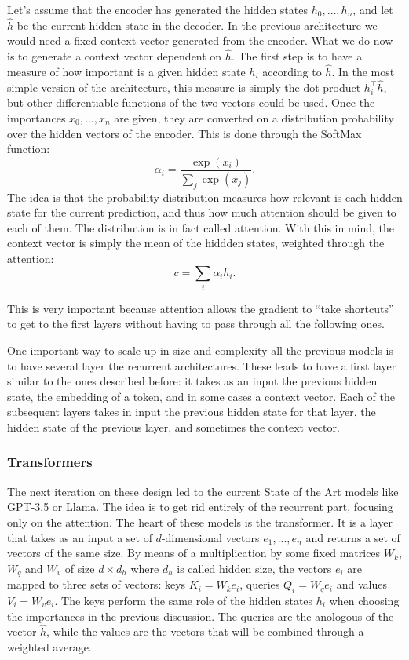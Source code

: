 \documentclass[]{marticle}
\begin{document}
Let's assume that the encoder has generated the hidden states $h_0, \dots, h_n$, and let $\hat{h}$ be
the current hidden state in the decoder. In the previous architecture we would need a fixed context
vector generated from the encoder. What we do now is to generate a context vector dependent on
$\hat{h}$. The first step is to have a measure of how important is a given hidden state $h_i$
according to $\hat{h}$. In the most simple version of the architecture, this measure is simply the
dot product $h_i^\top \hat{h}$, but other differentiable functions of the two vectors could be used.
Once the importances $x_0, ..., x_n$ are given, they are converted on a distribution probability
over the hidden vectors of the encoder. This is done through the SoftMax function:
$$ \alpha_i = \frac{\exp (x_i)}{\sum_j \exp (x_j)}. $$ 
The idea is that the probability distribution measures how relevant is each hidden state for the
current prediction, and thus how much attention should be given to each of them. The distribution is
in fact called attention. With this in mind, the context vector is simply the mean of the hiddden
states, weighted through the attention:
$$ c = \sum_i \alpha_i h_i. $$

This is very important because attention allows the gradient to ``take shortcuts'' to get to the first
layers without having to pass through all the following ones.

One important way to scale up in size and complexity all the previous models is to have several
layer the recurrent architectures. These leads to have a first layer similar to the ones described
before: it takes as an input the previous hidden state, the embedding of a token, and in some cases
a context vector. Each of the subsequent layers takes in input the previous hidden state for that
layer, the hidden state of the previous layer, and sometimes the context vector.

\subsubsection{Transformers}

The next iteration on these design led to the current State of the Art models like GPT-3.5 or Llama.
The idea is to get rid entirely of the recurrent part, focusing only on the attention. The heart of
these models is the transformer. It is a layer that takes as an input a set of $d$-dimensional
vectors $e_1,..., e_n$ and returns a set of vectors of the same size. By means of a multiplication
by some fixed matrices $W_k$, $W_q$ and $W_v$ of size $d\times d_h$ where $d_h$ is called hidden
size, the vectors $e_i$ are mapped to three sets of vectors: keys $K_i = W_k e_i$, queries $Q_i =
W_q e_i$ and values $V_i = W_v e_i$. The keys perform the same role of the hidden states $h_i$ when
choosing the importances in the previous discussion. The queries are the anologous of the vector
$\hat{h}$, while the values are the vectors that will be combined through a weighted average.
\end{document}
